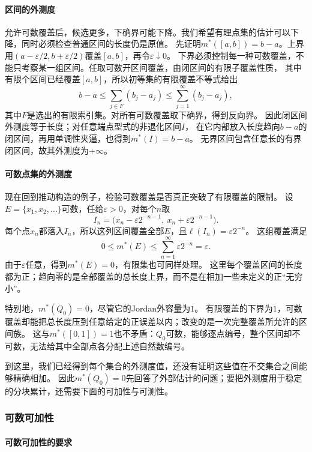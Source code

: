 \paragraph{区间的外测度}

允许可数覆盖后，候选更多，下确界可能下降。我们希望有理点集的估计可以下降，同时必须检查普通区间的长度仍是原值。
先证明$m^*([a,b])=b-a$。上界用$(a-\varepsilon/2,b+\varepsilon/2)$覆盖$[a,b]$，再令$\varepsilon\downarrow0$。
下界必须控制每一种可数覆盖，不能只考察某一组区间。任取可数开区间覆盖，由闭区间的有限子覆盖性质，
其中有限个区间已经覆盖$[a,b]$，所以初等集的有限覆盖不等式给出
\[
 b-a\leq\sum_{j\in F}(b_j-a_j)\leq\sum_{j=1}^{\infty}(b_j-a_j),
\]
其中$F$是选出的有限索引集。对所有可数覆盖取下确界，得到反向界。
因此闭区间外测度等于长度；对任意端点型式的非退化区间$I$，
在它内部放入长度趋向$b-a$的闭区间，再用单调性夹逼，也得到$m^*(I)=b-a$。
无界区间包含任意长的有界闭区间，故其外测度为$+\infty$。

\paragraph{可数点集的外测度}

现在回到推动构造的例子，检验可数覆盖是否真正突破了有限覆盖的限制。
设$E=\{x_1,x_2,\ldots\}$可数，任给$\varepsilon>0$，对每个$n$取
\[
 I_n=\bigl(x_n-\varepsilon2^{-n-1},\ x_n+\varepsilon2^{-n-1}\bigr).
\]
每个点$x_n$都落入$I_n$，所以这列区间覆盖全部$E$，且$\ell(I_n)=\varepsilon2^{-n}$。
这组覆盖满足
\[
 0\leq m^*(E)\leq\sum_{n=1}^{\infty}\varepsilon2^{-n}=\varepsilon.
\]
由于$\varepsilon$任意，得到$m^*(E)=0$，有限集也可同样处理。
这里每个覆盖区间的长度都为正；趋向零的是全部覆盖的总长度上界，而不是在相加一些未定义的正“无穷小”。

特别地，$m^*(Q_0)=0$，尽管它的Jordan外容量为$1$。
有限覆盖的下界为$1$，可数覆盖却能把总长度压到任意给定的正误差以内；改变的是一次完整覆盖所允许的区间族。
这与$m^*([0,1])=1$也不矛盾：$Q_0$可数，能够逐点编号，整个区间却不可数，无法给其中全部点各分配上述自然数编号。

到这里，我们已经得到每个集合的外测度值，还没有证明这些值在不交集合之间能够精确相加。
因此$m^*(Q_0)=0$先回答了外部估计的问题；要把外测度用于稳定的分块累计，还需要下面的可加性与可测性。

\subsubsection{可数可加性}

\paragraph{可数可加性的要求}

